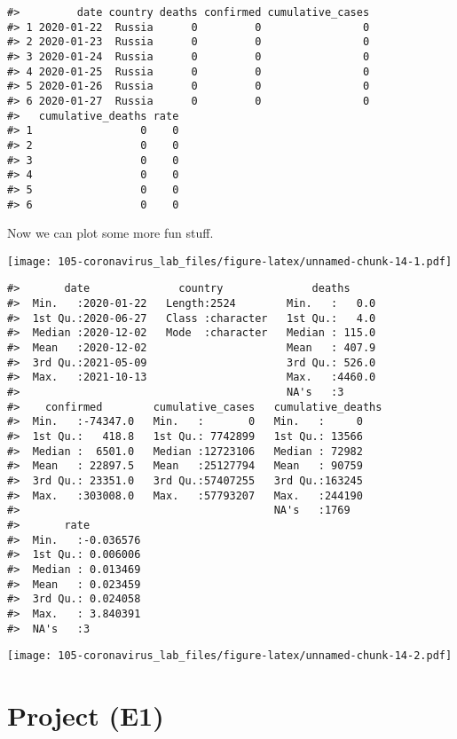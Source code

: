 \documentclass[
]{book}
\begin{document}
\begin{verbatim}
#>         date country deaths confirmed cumulative_cases
#> 1 2020-01-22  Russia      0         0                0
#> 2 2020-01-23  Russia      0         0                0
#> 3 2020-01-24  Russia      0         0                0
#> 4 2020-01-25  Russia      0         0                0
#> 5 2020-01-26  Russia      0         0                0
#> 6 2020-01-27  Russia      0         0                0
#>   cumulative_deaths rate
#> 1                 0    0
#> 2                 0    0
#> 3                 0    0
#> 4                 0    0
#> 5                 0    0
#> 6                 0    0
\end{verbatim}

Now we can plot some more fun stuff.

\texttt{[image: 105-coronavirus\_lab\_files/figure-latex/unnamed-chunk-14-1.pdf]}

\begin{verbatim}
#>       date              country              deaths      
#>  Min.   :2020-01-22   Length:2524        Min.   :   0.0  
#>  1st Qu.:2020-06-27   Class :character   1st Qu.:   4.0  
#>  Median :2020-12-02   Mode  :character   Median : 115.0  
#>  Mean   :2020-12-02                      Mean   : 407.9  
#>  3rd Qu.:2021-05-09                      3rd Qu.: 526.0  
#>  Max.   :2021-10-13                      Max.   :4460.0  
#>                                          NA's   :3       
#>    confirmed        cumulative_cases   cumulative_deaths
#>  Min.   :-74347.0   Min.   :       0   Min.   :     0   
#>  1st Qu.:   418.8   1st Qu.: 7742899   1st Qu.: 13566   
#>  Median :  6501.0   Median :12723106   Median : 72982   
#>  Mean   : 22897.5   Mean   :25127794   Mean   : 90759   
#>  3rd Qu.: 23351.0   3rd Qu.:57407255   3rd Qu.:163245   
#>  Max.   :303008.0   Max.   :57793207   Max.   :244190   
#>                                        NA's   :1769     
#>       rate          
#>  Min.   :-0.036576  
#>  1st Qu.: 0.006006  
#>  Median : 0.013469  
#>  Mean   : 0.023459  
#>  3rd Qu.: 0.024058  
#>  Max.   : 3.840391  
#>  NA's   :3
\end{verbatim}

\texttt{[image: 105-coronavirus\_lab\_files/figure-latex/unnamed-chunk-14-2.pdf]}

\hypertarget{project-e1}{%
\chapter{Project (E1)}\label{project-e1}}
\end{document}
